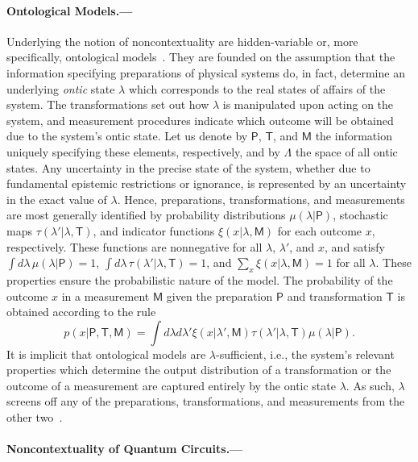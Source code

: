 \documentclass[prl,twocolumn,amsmath,amssymb,nofootinbib]{revtex4-1}
\newcommand\dmu[1]{\int{d #1}}
\newcommand\ddmu[2]{\int{d #1 d #2}}
\newcommand{\MM}{\mathsf{M}}
\newcommand{\pp}{\mathsf{P}}
\newcommand{\TT}{\mathsf{T}}
\begin{document}
\paragraph*{Ontological Models.---}
Underlying the notion of noncontextuality are hidden-variable or, more specifically, ontological models~\cite{Spekkens2005}.
They are founded on the assumption that the information specifying preparations of physical systems do, in fact, determine an underlying {\it ontic} state $\lambda$ which corresponds to the real states of affairs of the system. 
The transformations set out how $\lambda$ is manipulated upon acting on the system, and measurement procedures indicate which outcome will be obtained due to the system's ontic state.
Let us denote by $\pp$, $\TT$, and $\MM$ the information uniquely specifying these elements, respectively, and by $\Lambda$ the space of all ontic states.
Any uncertainty in the precise state of the system, whether due to fundamental epistemic restrictions or ignorance, is represented by an uncertainty in the exact value of $\lambda$.
Hence, preparations, transformations, and measurements are most generally identified by probability distributions $\mu(\lambda|\pp)$, stochastic maps $\tau(\lambda'|\lambda,\TT)$, and indicator functions $\xi(x|\lambda,\MM)$ for each outcome $x$, respectively.
These functions are nonnegative for all $\lambda$, $\lambda'$, and $x$, and satisfy $\dmu \lambda\, \mu(\lambda|\pp){=} 1$, $\dmu\lambda\,\tau(\lambda'|\lambda,\TT){=}1$, and $\sum_{x}\xi(x|\lambda,\MM){=}1$ for all $\lambda$.
These properties ensure the probabilistic nature of the model.
The probability of the outcome $x$ in a measurement $\MM$ given the preparation $\pp$ and transformation $\TT$ is obtained according to the rule 
%
\begin{equation}\label{eq:Bayes}
p(x|\pp,\TT,\MM) = \ddmu\lambda\lambda' \xi(x|\lambda',\MM)\tau(\lambda'|\lambda,\TT)\mu(\lambda|\pp).
\end{equation}
%
It is implicit that ontological models are $\lambda$-sufficient, i.e., the system’s relevant properties which determine the output distribution of a transformation or the outcome of a measurement are captured entirely by the ontic state $\lambda$.
As such, $\lambda$ screens off any of the preparations, transformations, and measurements from the other two~\cite{Harrigan2010}.


\paragraph*{Noncontextuality of Quantum Circuits.---}
\end{document}
